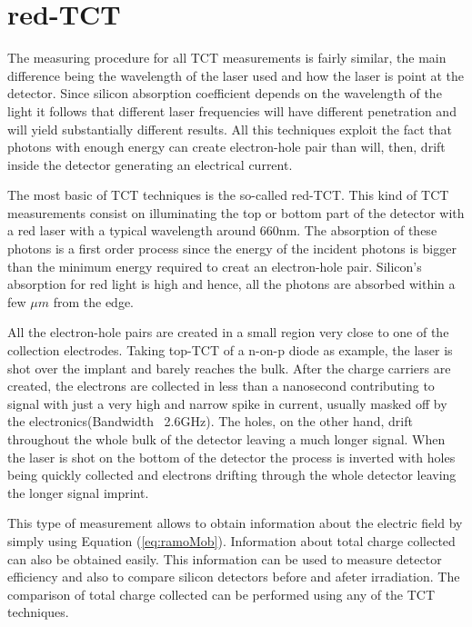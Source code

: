 \section{red-TCT} %
\label{sec:redTCT}

The measuring procedure for all TCT measurements is fairly similar, the main difference being the wavelength of the laser used and how the laser is point at the detector. Since silicon absorption coefficient depends on the wavelength of the light it follows that different laser frequencies will have different penetration and will yield substantially different results. All this techniques exploit the fact that photons with enough energy can create electron-hole pair than will, then, drift inside the detector generating an electrical current. 

The most basic of TCT techniques is the so-called red-TCT. This kind of TCT measurements consist on illuminating the top or bottom part of the detector with a red laser with a typical wavelength around 660nm. The absorption of these photons is a first order process since the energy of the incident photons is bigger than the minimum energy required to creat an electron-hole pair. Silicon's absorption for red light is high and hence, all the photons are absorbed within a few $\mu m$ from the edge. 

All the electron-hole pairs are created in a small region very close to one of the collection electrodes. Taking top-TCT of a n-on-p diode as example, the laser is shot over the implant and barely reaches the bulk. After the charge carriers are created, the electrons are collected in less than a nanosecond contributing to signal with just a very high and narrow spike in current, usually masked off by the electronics(Bandwidth ~2.6GHz). The holes, on the other hand, drift throughout the whole bulk of the detector leaving a much longer signal. When the laser is shot on the bottom of the detector the process is inverted with holes being quickly collected and electrons drifting through the whole detector leaving the longer signal imprint.

This type of measurement allows to obtain information about the electric field by simply using Equation (\ref{eq:ramoMob}). Information about total charge collected can also be obtained easily. This information can be used to measure detector efficiency and also to compare silicon detectors before and afeter irradiation. The comparison of total charge collected can be performed using any of the TCT techniques.

